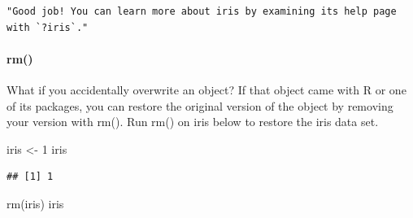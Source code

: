 \documentclass[
]{article}
\newenvironment{Shaded}{\begin{snugshade}}{\end{snugshade}}
\newcommand{\DecValTok}[1]{\textcolor[rgb]{0.00,0.00,0.81}{#1}}
\newcommand{\FunctionTok}[1]{\textcolor[rgb]{0.00,0.00,0.00}{#1}}
\newcommand{\NormalTok}[1]{#1}
\newcommand{\OtherTok}[1]{\textcolor[rgb]{0.56,0.35,0.01}{#1}}
\begin{document}
\begin{verbatim}
"Good job! You can learn more about iris by examining its help page with `?iris`."
\end{verbatim}

\hypertarget{rm}{%
\paragraph{rm()}\label{rm}}

What if you accidentally overwrite an object? If that object came with R
or one of its packages, you can restore the original version of the
object by removing your version with rm(). Run rm() on iris below to
restore the iris data set.

\begin{Shaded}
\begin{Highlighting}[]
\NormalTok{iris }\OtherTok{\textless{}{-}} \DecValTok{1}
\NormalTok{iris}
\end{Highlighting}
\end{Shaded}

\begin{verbatim}
## [1] 1
\end{verbatim}

\begin{Shaded}
\begin{Highlighting}[]
\FunctionTok{rm}\NormalTok{(iris)}
\NormalTok{iris}
\end{Highlighting}
\end{Shaded}
\end{document}
